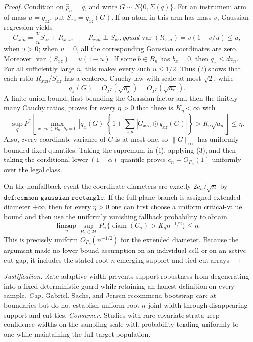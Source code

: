 \documentclass{article}
\begin{document}
\begin{proof}
Condition on \(\widehat p_n=q\), and write \(G\sim N\{0,\Sigma(q)\}\).  For an instrument arm of mass \(u=q_{xz}\), put \(S_{xz}=q_{xz}(G)\).  If an atom in this arm has mass \(v\), Gaussian regression yields
\[
G_{xza}=\frac vuS_{xz}+R_{xza},
\qquad
R_{xza}\perp S_{xz},qquad
\operatorname{var}(R_{xza})=v(1-v/u)\le u,
\tag{2}
\]
when \(u>0\); when \(u=0\), all the corresponding Gaussian coordinates are zero.  Moreover \(\operatorname{var}(S_{xz})=u(1-u)\).  If some \(b\in B_n\) has \(b_x=0\), then \(q_x\le d a_n\).  For all sufficiently large \(n\), this makes every such \(u\le1/2\).  Thus (2) shows that each ratio \(R_{xza}/S_{xz}\) has a centered Cauchy law with scale at most \(\sqrt2\), while
\[
q_x(G)=O_{P^*}(\sqrt{q_x})=O_{P^*}(\sqrt{a_n}).
\]
A finite union bound, first bounding the Gaussian factor and then the finitely many Cauchy ratios, proves for every \(\eta>0\) that there is \(K_\eta<\infty\) with
\[
\sup_q P^*\!\left[
\max_{x:\,\exists b\in B_n,\ b_x=0}
|q_x(G)|\left\{1+\sum_{z,a}|G_{xza}\oslash q_{xz}(G)|\right\}
>K_\eta\sqrt{a_n}\right]\le\eta.
\tag{3}
\]
Also, every coordinate variance of \(G\) is at most one, so \(\|G\|_\infty\) has uniformly bounded fixed quantiles.  Taking the supremum in (1), applying (3), and then taking the conditional lower \((1-\alpha)\)-quantile proves \(c_n=O_{P_n}(1)\) uniformly over the legal class.

On the nonfallback event the coordinate diameters are exactly \(2c_n/\sqrt n\) by \(\texttt{def:common-gaussian-rectangle}\).  If the full-plane branch is assigned extended diameter \(+\infty\), then for every \(\eta>0\) one can first choose a uniform critical-value bound and then use the uniformly vanishing fallback probability to obtain
\[
\limsup_n\sup_{P_n\in\mathcal M}
P_n\{\operatorname{diam}(C_n)>K_\eta n^{-1/2}\}\le\eta.
\]
This is precisely uniform \(O_{P_n}(n^{-1/2})\) for the extended diameter.  Because the argument made no lower-bound assumption on an individual cell or on an active-cut gap, it includes the stated root-\(n\) emerging-support and tied-cut arrays.
\end{proof}
\par\smallskip\noindent \textit{Justification.} Rate-adaptive width prevents support robustness from degenerating into a fixed deterministic guard while retaining an honest definition on every sample. \textit{Gap.} Gabriel, Sachs, and Jensen recommend bootstrap care at boundaries but do not establish uniform root-\(n\) joint width through disappearing support and cut ties. \textit{Consumer.} Studies with rare covariate strata keep confidence widths on the sampling scale with probability tending uniformly to one while maintaining the full target population.
\end{document}
